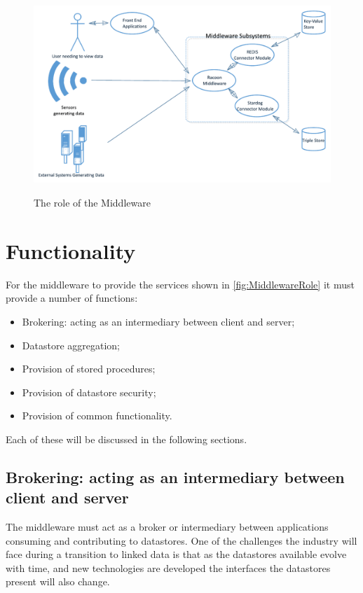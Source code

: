  \begin{figure}[H]
\myfloatalign
{\includegraphics[width=\linewidth]{gfx/Middleware_role}} 
\caption{The role of the Middleware}
\label{fig:MiddlewareRole}
\end{figure}

\section{Functionality}
 \label{sec:function}
For the middleware to provide the services shown in \autoref{fig:MiddlewareRole} it must provide a number of functions:
\begin{itemize} 
    \item Brokering: acting as an intermediary between client and server;
    \item Datastore aggregation;
    \item Provision of stored procedures;
    \item Provision of datastore security;
    \item Provision of common functionality.
\end{itemize}

Each of these will be discussed in the following sections.

\subsection {Brokering: acting as an intermediary between client and server}
The middleware must act as a broker or intermediary between applications consuming and contributing to datastores. One of the challenges the industry will face during a transition to linked data is that as the datastores available evolve with time, and new technologies are developed the interfaces the datastores present will also change.

